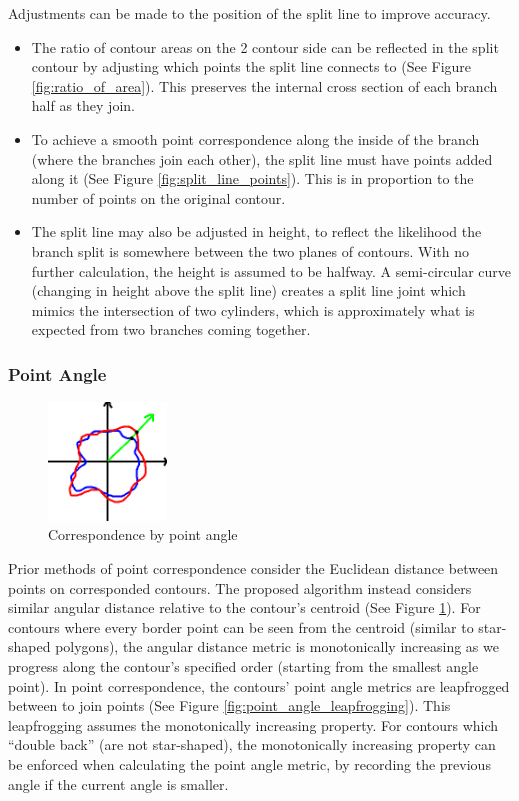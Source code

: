 \documentclass[11p, titlepage]{article}
\begin{document}
Adjustments can be made to the position of the split line to improve accuracy. 
\begin{itemize}
\item The ratio of contour areas on the 2 contour side can be reflected in the split contour by adjusting which points the split line connects to (See Figure \ref{fig:ratio_of_area}). This preserves the internal cross section of each branch half as they join. 
\item To achieve a smooth point correspondence along the inside of the branch (where the branches join each other), the split line must have points added along it (See Figure \ref{fig:split_line_points}). This is in proportion to the number of points on the original contour.
\item The split line may also be adjusted in height, to reflect the likelihood the branch split is somewhere between the two planes of contours. With no further calculation, the height is assumed to be halfway. A semi-circular curve (changing in height above the split line) creates a split line joint which mimics the intersection of two cylinders, which is approximately what is expected from two branches coming together.
\end{itemize}

\subsubsection{Point Angle}

\begin{figure}
\centering
\includegraphics[width=0.28\textwidth]{diagrams/point_angle}
\caption{Correspondence by point angle \label{fig:point_angle}}
\end{figure}

Prior methods of point correspondence consider the Euclidean distance between points on corresponded contours. The proposed algorithm instead considers similar angular distance relative to the contour's centroid (See Figure \ref{fig:point_angle}). For contours where every border point can be seen from the centroid (similar to star-shaped polygons), the angular distance metric is monotonically increasing as we progress along the contour's specified order (starting from the smallest angle point). In point correspondence, the contours' point angle metrics are leapfrogged between to join points (See Figure \ref{fig:point_angle_leapfrogging}). This leapfrogging assumes the monotonically increasing property. For contours which ``double back'' (are not star-shaped), the monotonically increasing property can be enforced when calculating the point angle metric, by recording the previous angle if the current angle is smaller.
\end{document}
